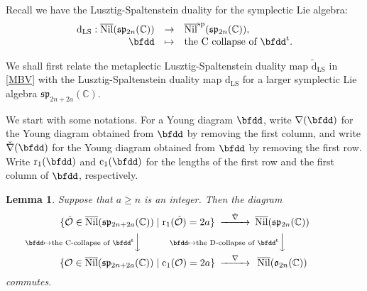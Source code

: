\documentclass[12pt,a4paper]{amsart}
\newcommand{\BC}{{\mathbb {C}}}
\newcommand{\CO}{{\mathcal {O}}}
\newcommand{\p}{\mathfrak p}
\newcommand{\s}{\mathfrak s}
\renewcommand{\o}{\mathfrak o}
\newcommand{\be}{\begin {equation}}
\newcommand{\ee}{\end {equation}}
\numberwithin{equation}{section}
\newtheorem{lem}[thm]{Lemma}
\theoremstyle{remark}
\begin{document}

Recall we have the Lusztig-Spaltenstein duality for the symplectic Lie algebra:
\[
\begin{array}{rcl}
   \mathrm d_{\mathrm{LS}}:  \overline{\mathrm{Nil}}(\s\p_{2n}(\BC))&\rightarrow &\overline{\mathrm{Nil}}^{\mathrm{sp}}(\s\p_{2n}(\BC)),\\
     \bfdd&\mapsto&  \textrm{the C  collapse of  $\bfdd^{\mathrm t}$}.
     \end{array}
     \]


We shall first relate the metaplectic Lusztig-Spaltenstein duality map $\tilde{\mathrm d}_{\mathrm{LS}}$ in \eqref{MBV} with the Lusztig-Spaltenstein duality map ${\mathrm d}_{\mathrm{LS}}$ for a larger symplectic Lie algebra $\s\p_{2n+2a}(\BC)$.

We start with some notations. For a Young diagram $\bfdd$, write $\nabla(\bfdd)$ for the Young diagram obtained from $\bfdd$ by removing the first column, and write $\check \nabla(\bfdd)$ for the Young diagram obtained from $\bfdd$ by removing the first row.  Write $\mathrm r_1(\bfdd)$ and $\mathrm c_1(\bfdd)$ for the lengths of the first row and the first column of $\bfdd$, respectively.


\begin{lem}\label{spspo000}
Suppose that $a\geq n$ is an integer. Then the diagram
\be\label{cdls}
 \begin{CD}
            \{\check \CO\in \overline{\mathrm{Nil}}(\s\p_{2n+2a}(\BC))\mid \mathrm{r}_1(\check \CO)=2a\} @>  \check \nabla  >> \overline{\mathrm{Nil}}(\s\p_{2n}(\BC)) \\
            @V \bfdd\mapsto \textrm{the C-collapse of  $\bfdd^{\mathrm t}$} VV           @V\bfdd\mapsto \textrm{the D-collapse of  $\bfdd^{\mathrm t}$}V V\\
               \{\CO\in \overline{\mathrm{Nil}}(\s\p_{2n+2a}(\BC))\mid \mathrm{c}_1( \CO)=2a\}
             @> \nabla   >>  \overline{\mathrm{Nil}}(\o_{2n}(\BC))\\
  \end{CD}
\ee
commutes.%

\end{lem}
\end{document}
